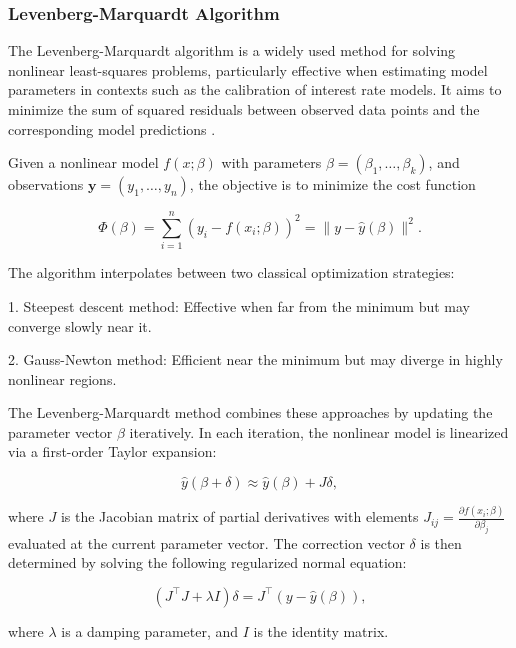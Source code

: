 \subsubsection{Levenberg-Marquardt Algorithm} \label{lm_algorithm}
The Levenberg-Marquardt algorithm is a widely used method for solving nonlinear least-squares problems, particularly effective when estimating model parameters in contexts such as the calibration of interest rate models. It aims to minimize the sum of squared residuals between observed data points and the corresponding model predictions \parencite{marquardt1963}.

Given a nonlinear model $f(x; \beta)$ with parameters $\beta = (\beta_1, \dots, \beta_k)$, and observations $\mathbf{y} = (y_1, \dots, y_n)$, the objective is to minimize the cost function

\begin{equation}
	\Phi(\beta) = \sum_{i=1}^{n} \left( y_i - f(x_i; \beta) \right)^2 = \| y - \hat{y}(\beta) \|^2.
\end{equation}

The algorithm interpolates between two classical optimization strategies:

1. Steepest descent method: Effective when far from the minimum but may converge slowly near it.

2. Gauss-Newton method: Efficient near the minimum but may diverge in highly nonlinear regions.

The Levenberg-Marquardt method combines these approaches by updating the parameter vector $\beta$ iteratively. In each iteration, the nonlinear model is linearized via a first-order Taylor expansion:

\begin{equation}
	\hat{y}(\beta + \delta) \approx \hat{y}(\beta) + J \delta,
\end{equation}

where $J$ is the Jacobian matrix of partial derivatives with elements $J_{ij} = \frac{\partial f(x_i; \beta)}{\partial \beta_j}$ evaluated at the current parameter vector. The correction vector $\delta$ is then determined by solving the following regularized normal equation:

\begin{equation}
	(J^\top J + \lambda I)\delta = J^\top (y - \hat{y}(\beta)),
\end{equation}

where $\lambda$ is a damping parameter, and $I$ is the identity matrix.


